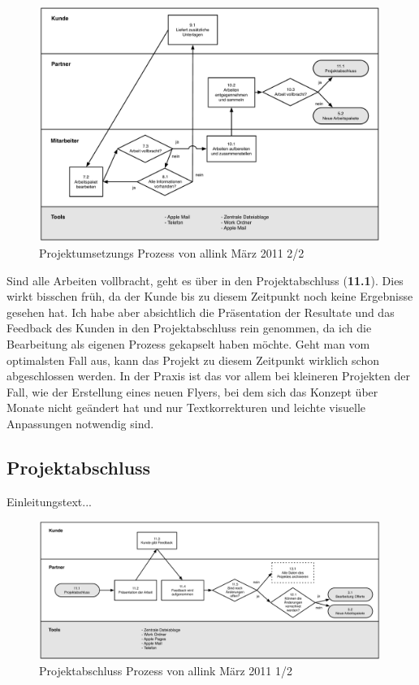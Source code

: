\begin{figure}[htbp]
\begin{center}
\includegraphics[width=0.99\textwidth,angle=0]{./bilder/analyse/02_ist_prozesse_arbeit_02.pdf}
\caption{Projektumsetzungs Prozess von allink März 2011 2/2}
\label{pic:02_ist_prozesse_arbeit_02}
\end{center}
\end{figure}

Sind alle Arbeiten vollbracht, geht es über in den Projektabschluss (\textbf{11.1}). Dies wirkt
bisschen früh, da der Kunde bis zu diesem Zeitpunkt noch keine Ergebnisse gesehen
hat. Ich habe aber absichtlich die Präsentation der Resultate und das Feedback
des Kunden in den Projektabschluss rein genommen, da ich die Bearbeitung als eigenen
Prozess gekapselt haben möchte. Geht man vom optimalsten Fall aus, kann das
Projekt zu diesem Zeitpunkt wirklich schon abgeschlossen werden. In der Praxis
ist das vor allem bei kleineren Projekten der Fall, wie der Erstellung eines
neuen Flyers, bei dem sich das Konzept über Monate nicht geändert hat und nur
Textkorrekturen und leichte visuelle Anpassungen notwendig sind.

\clearpage

\subsection{Projektabschluss}
Einleitungstext...

\begin{figure}[htbp]
\begin{center}
\includegraphics[width=0.99\textwidth,angle=0]{./bilder/analyse/03_ist_prozesse_abschluss_01.pdf}
\caption{Projektabschluss Prozess von allink März 2011 1/2}
\label{pic:03_ist_prozesse_abschluss_01}
\end{center}
\end{figure}

